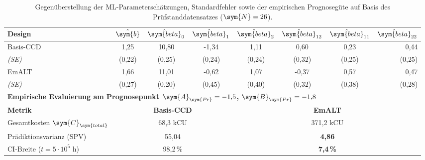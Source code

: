 \begin{table}[htbp]
    \centering
    \caption{Gegenüberstellung der ML-Parameterschätzungen, Standardfehler sowie der empirischen Prognosegüte auf Basis des Prüfstanddatensatzes ($\sym{N}=26$).}
    \label{tab:ieee_parameter_estimates}
    \renewcommand{\arraystretch}{1.2}
    \small
    \begin{tabular*}{\textwidth}{@{\extracolsep{\fill}}l cccccc r@{}}
        \toprule
        \textbf{Design} & $\hat{\sym{b}}$ & $\hat{\sym{beta}}_{0}$ & $\hat{\sym{beta}}_{1}$ & $\hat{\sym{beta}}_{2}$ & $\hat{\sym{beta}}_{12}$ & $\hat{\sym{beta}}_{11}$ & $\hat{\sym{beta}}_{22}$ \\
        \midrule
        Basis-CCD & 1{,}25 & 10{,}80 & -1{,}34 & 1{,}11 & 0{,}60 & 0{,}23 & 0{,}44 \\
        \textit{(SE)} & (0{,}22) & (0{,}25) & (0{,}24) & (0{,}24) & (0{,}32) & (0{,}25) & (0{,}25) \\
        \midrule
        EmALT & 1{,}66 & 11{,}01 & -0{,}62 & 1{,}07 & -0{,}37 & 0{,}57 & 0{,}47 \\
        \textit{(SE)} & (0{,}27) & (0{,}20) & (0{,}45) & (0{,}40) & (0{,}32) & (0{,}38) & (0{,}28) \\
        \midrule
        \multicolumn{8}{l}{\textbf{Empirische Evaluierung am Prognosepunkt $\sym{A}_{\sym{Pr}}=-1{,}5$, $\sym{B}_{\sym{Pr}}=-1{,}8$}} \\
        \midrule
        \textbf{Metrik} & \multicolumn{3}{c}{\textbf{Basis-CCD}} & \multicolumn{4}{c}{\textbf{EmALT}} \\
        Gesamtkosten $\sym{C}_{\sym{total}}$ & \multicolumn{3}{c}{68{,}3 kCU} & \multicolumn{4}{c}{371{,}2 kCU} \\
        Prädiktionsvarianz (\ac{SPV}) & \multicolumn{3}{c}{55{,}04} & \multicolumn{4}{c}{\textbf{4{,}86}} \\
        \ac{CI}-Breite ($t = 5\cdot 10^5\text{ h}$) & \multicolumn{3}{c}{98{,}2\,\%} & \multicolumn{4}{c}{\textbf{7{,}4\,\%}} \\
        \bottomrule
    \end{tabular*}
\end{table}
